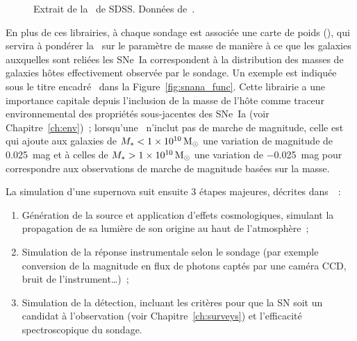 \documentclass[../main/main.tex]{subfiles}
\begin{document}
\begin{figure}[h!]
    \centering
    \begin{minipage}{0.75\linewidth}
    \end{minipage}
    \caption[Extrait de la \simlib\ de SDSS]{Extrait de la \simlib\ de SDSS.
    Données de~\cite{kessler2013}.}
    \label{fig:sdssimlib}
\end{figure}

En plus de ces librairies, à chaque sondage est associée une carte de poids
(\wgtmap), qui servira à pondérer la \hostlib\ sur le paramètre de masse de
manière à ce que les galaxies auxquelles sont reliées les SNe~Ia correspondent à
la distribution des masses de galaxies hôtes effectivement observée par le
sondage. Un exemple est indiquée sous le titre encadré \wgtmap\ dans la
Figure~\ref{fig:snana_func}. Cette librairie a une importance capitale depuis
l'inclusion de la masse de l'hôte comme traceur environnemental des propriétés
sous-jacentes des SNe~Ia (voir Chapitre~\ref{ch:env})~; lorsqu'une \hostlib\
n'inclut pas de marche de magnitude, celle est qui ajoute aux galaxies de $M_* <
\SI{1e10}{\ensuremath{M_{\odot}}}$ une variation de magnitude de \SI{0.025}{mag} et à celles de
$M_* > \SI{1e10}{\ensuremath{M_{\odot}}}$ une variation de \SI{-0.025}{mag} pour correspondre aux
observations de marche de magnitude basées sur la masse.

La simulation d'une supernova suit ensuite 3 étapes majeures, décrites
dans~\cite{kessler2019}~:
\begin{enumerate}
    \item Génération de la source et application d'effets cosmologiques,
        simulant la propagation de sa lumière de son origine au haut de
        l'atmosphère~;
    \item Simulation de la réponse instrumentale selon le sondage (par exemple
        conversion de la magnitude en flux de photons captés par une caméra CCD,
        bruit de l'instrument…)~;
    \item Simulation de la détection, incluant les critères pour que la SN soit
        un candidat à l'observation (voir Chapitre~\ref{ch:surveys}) et
        l'efficacité spectroscopique du sondage.
\end{enumerate}
\end{document}
